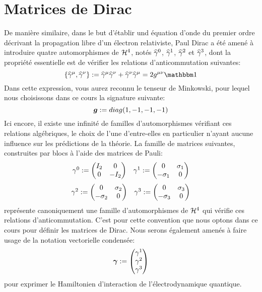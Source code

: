\section{Matrices de Dirac}

De manière similaire,
dans le but d'établir und équation d'onde du premier ordre décrivant la propagation libre d'un électron relativiste,
Paul Dirac a été amené à introduire quatre automorphismes de $\mathcal H^4$,
notés $\widehat{\gamma}^{0}$, $\widehat{\gamma}^{1}$, $\widehat{\gamma}^{2}$ et $\widehat{\gamma}^{3}$,
dont la propriété essentielle est de vérifier les relations d'anticommutation suivantes:
\begin{equation*}
\left\{ \gamop \mu, \gamop \nu \right\} \eqdef \gamop \mu \gamop \nu + \gamop \nu \gamop \mu = 2 \stthh g \mu \nu \Id
\end{equation*}
Dans cette expression, vous aurez reconnu le tenseur de Minkowski,
pour lequel nous choisissons dans ce cours la signature suivante:
\begin{equation*}
\boldsymbol{g} := diag(1,-1,-1,-1)
\end{equation*}
Ici encore, il existe une infinité de familles d'automorphismes vérifiant ces relations algébriques,
le choix de l'une d'entre-elles en particulier n'ayant aucune influence sur les prédictions de la théorie.
La famille de matrices suivantes, construites par blocs à l'aide des matrices de Pauli:
$$
\begin{array}{cc}
\gamma^{0} := \left(\begin{matrix} I_2 & 0 \\ 0 & -I_2 \end{matrix}\right) &
\gamma^{1} := \left(\begin{matrix} 0 & \sigma_{1} \\ -\sigma_{1} & 0 \end{matrix}\right)
\end{array}
$$
$$
\begin{array}{cc}
\gamma^{2} := \left(\begin{matrix} 0 & \sigma_{2} \\ -\sigma_{2} & 0 \end{matrix}\right) &
\gamma^{3} := \left(\begin{matrix} 0 & \sigma_{3} \\ -\sigma_{3} & 0 \end{matrix}\right)
\end{array}
$$
représente canoniquement une famille d'automorphismes de $\mathcal H^4$ qui vérifie ces relations d'anticommutation.
C'est pour cette convention que nous optons dans ce cours pour définir les matrices de Dirac.
Nous serons également amenés à faire usage de la notation vectorielle condensée:
\begin{equation*}
\boldsymbol{\gamma} := \left(\begin{matrix}  \gamma^{1} \\ \gamma^{2} \\ \gamma^{3} \end{matrix}\right)
\end{equation*}
pour exprimer le Hamiltonien d'interaction de l'électrodynamique quantique.
